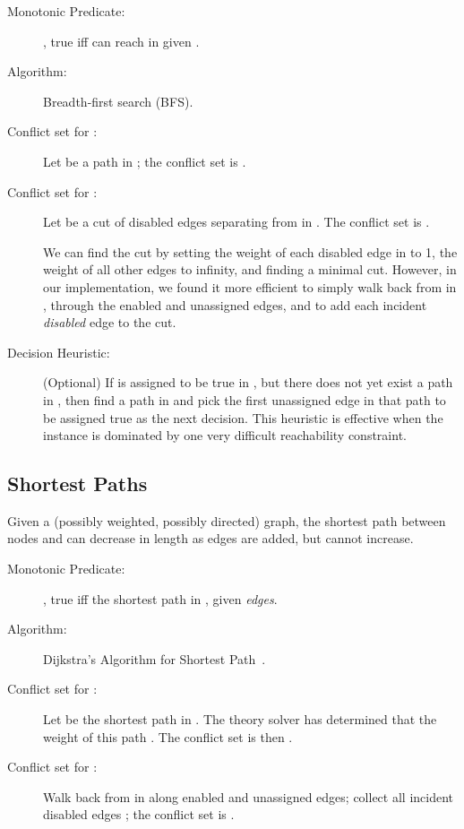 \documentclass[runningheads]{llncs}
\begin{document}
\begin{description}
\item[Monotonic Predicate:] , true iff  can reach  in  given . \item[Algorithm:] Breadth-first search (BFS).
\item[Conflict set for :] Let  be a  path in ; the conflict set is . 

\item[Conflict set for :] Let   be a cut of disabled edges separating  from  in . The conflict set is .

We can find the cut by setting the weight of each disabled edge in 
to 1, the weight of all other edges to infinity, and finding a minimal
 cut. However, in our implementation, we found it more efficient to simply
walk back from  in , through the enabled and unassigned edges,
and to add each incident \textit{disabled} edge to the cut.


\item[Decision Heuristic:] (Optional) If  is assigned to be true in , but there does not yet exist a  path in ,  then find a  path in  and pick the first unassigned edge in that path to be assigned true as the next decision. This heuristic is effective when the instance is dominated by one very difficult reachability constraint. 



\end{description}


\subsection{{Shortest Paths}}
Given a (possibly weighted, possibly directed) graph, the shortest path between nodes  and  can decrease in length as edges are added, but cannot increase. 

\begin{description}
\item[Monotonic Predicate:] , true iff the shortest  path  in , given \textit{edges}. \item[Algorithm:] Dijkstra's Algorithm for Shortest Path~\cite{dijkstra1959note}.
\item[Conflict set for :] Let 
be the shortest  path in .  The theory solver has determined
that the weight of this path .  The conflict set is
then .
\item[Conflict set for :] Walk back from  in  along enabled and unassigned edges; collect all incident disabled edges ; the conflict set is .

\end{description}
\end{document}
